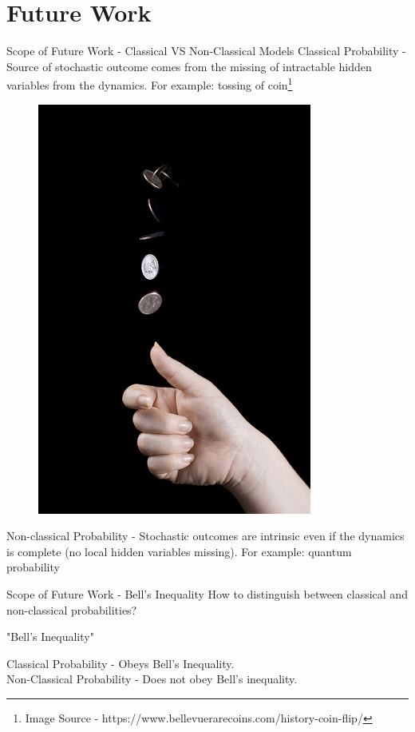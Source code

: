 \documentclass{beamer}
\begin{document}
\section{Future Work}
 \begin{frame}{Scope of Future Work - Classical VS Non-Classical Models}
    Classical Probability - Source of stochastic outcome comes from the missing of intractable hidden variables from the dynamics. For example: tossing of coin\footnote{Image Source - https://www.bellevuerarecoins.com/history-coin-flip/}
    \begin{figure}
        \centering
        \includegraphics[scale=0.2]{Images/unnamed.jpg}
        \label{fig:fig_4}
    \end{figure}
    Non-classical Probability - Stochastic outcomes are intrinsic even if the dynamics is complete (no local hidden variables missing). For example: quantum probability
 \end{frame}
 \begin{frame}{Scope of Future Work - Bell's Inequality}
     How to distinguish between classical and non-classical probabilities? \\
     \vspace{10mm}
     \Large{\centerline{"Bell's Inequality"}}
     \vspace{10mm}
     
     Classical Probability - Obeys Bell's Inequality. \\
     \vspace{5mm}
     Non-Classical Probability - Does not obey Bell's inequality.
 \end{frame}
\end{document}

